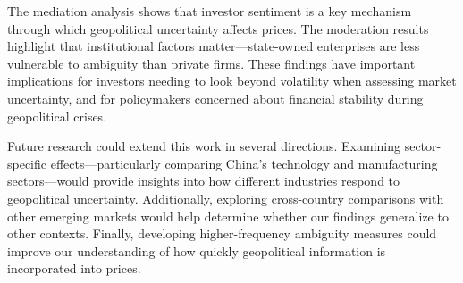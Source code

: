\documentclass[preprint,12pt,authoryear]{elsarticle}
\begin{document}
The mediation analysis shows that investor sentiment is a key mechanism through which geopolitical uncertainty affects prices. The moderation results highlight that institutional factors matter—state-owned enterprises are less vulnerable to ambiguity than private firms. These findings have important implications for investors needing to look beyond volatility when assessing market uncertainty, and for policymakers concerned about financial stability during geopolitical crises.

Future research could extend this work in several directions. Examining sector-specific effects—particularly comparing China's technology and manufacturing sectors—would provide insights into how different industries respond to geopolitical uncertainty. Additionally, exploring cross-country comparisons with other emerging markets would help determine whether our findings generalize to other contexts. Finally, developing higher-frequency ambiguity measures could improve our understanding of how quickly geopolitical information is incorporated into prices.



\end{document}
